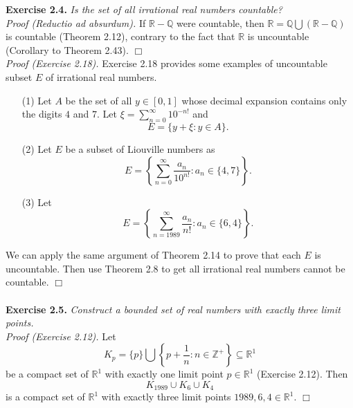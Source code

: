 \documentclass{article}
\begin{document}



\textbf{Exercise 2.4.}
\emph{Is the set of all irrational real numbers countable?} \\

\emph{Proof (Reductio ad absurdum).}
If $\mathbb{R}-\mathbb{Q}$ were countable,
then $\mathbb{R} = \mathbb{Q} \bigcup (\mathbb{R}-\mathbb{Q})$ is countable
(Theorem 2.12),
contrary to the fact that
$\mathbb{R}$ is uncountable (Corollary to Theorem 2.43).
$\Box$ \\

\emph{Proof (Exercise 2.18).}
Exercise 2.18 provides
some examples of uncountable subset $E$ of irrational real numbers.
\begin{enumerate}
  \item[(1)]
  Let $A$ be the set of all $y \in [0,1]$
  whose decimal expansion contains only the digits $4$ and $7$.
  Let $\xi = \sum_{n=0}^{\infty} 10^{-n!}$ and $$E = \{ y + \xi : y \in A \}.$$
  \item[(2)]
  Let $E$ be a subset of Liouville numbers as
  $$E = \left\{ \sum_{n=0}^{\infty} \frac{a_n}{10^{n!}} : a_n \in \{4, 7\} \right\}.$$
  \item[(3)]
  Let
  $$E = \left\{ \sum_{n=1989}^{\infty} \frac{a_n}{n!} : a_n \in \{6, 4\} \right\}.$$
\end{enumerate}
We can apply the same argument of Theorem 2.14 to prove that each $E$ is uncountable.
Then use Theorem 2.8 to get all irrational real numbers cannot be countable.
$\Box$ \\\\






\textbf{Exercise 2.5.}
\emph{Construct a bounded set of real numbers with exactly three limit points.} \\

\emph{Proof (Exercise 2.12).}
Let
$$K_{p} =
\{ p \}
\bigcup
\left\{ p + \frac{1}{n} : n \in \mathbb{Z}^+ \right\} \subseteq \mathbb{R}^1$$
be a compact set of $\mathbb{R}^1$ with exactly one limit point $p \in \mathbb{R}^1$
(Exercise 2.12).
Then
$$K_{1989} \cup K_{6} \cup K_{4}$$
is a compact set of $\mathbb{R}^1$ with exactly three limit points
$1989, 6, 4 \in \mathbb{R}^1$.
$\Box$ \\\\
\end{document}
